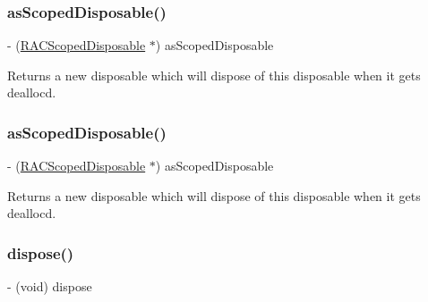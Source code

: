 \subsubsection{\texorpdfstring{as\+Scoped\+Disposable()}{asScopedDisposable()}\hspace{0.1cm}{\footnotesize\ttfamily [2/3]}}
{\footnotesize\ttfamily -\/ (\mbox{\hyperlink{interface_r_a_c_scoped_disposable}{R\+A\+C\+Scoped\+Disposable}} $\ast$) as\+Scoped\+Disposable \begin{DoxyParamCaption}{ }\end{DoxyParamCaption}}

Returns a new disposable which will dispose of this disposable when it gets dealloc\textquotesingle{}d. \mbox{\label{interface_r_a_c_disposable_a44a30ba7bac71901227b8a6eadaa23f5}} 
\subsubsection{\texorpdfstring{as\+Scoped\+Disposable()}{asScopedDisposable()}\hspace{0.1cm}{\footnotesize\ttfamily [3/3]}}
{\footnotesize\ttfamily -\/ (\mbox{\hyperlink{interface_r_a_c_scoped_disposable}{R\+A\+C\+Scoped\+Disposable}} $\ast$) as\+Scoped\+Disposable \begin{DoxyParamCaption}{ }\end{DoxyParamCaption}}

Returns a new disposable which will dispose of this disposable when it gets dealloc\textquotesingle{}d. \mbox{\label{interface_r_a_c_disposable_a3158dc03efcf49e7a5174acc6e3711d5}} 
\subsubsection{\texorpdfstring{dispose()}{dispose()}\hspace{0.1cm}{\footnotesize\ttfamily [1/3]}}
{\footnotesize\ttfamily -\/ (void) dispose \begin{DoxyParamCaption}{ }\end{DoxyParamCaption}}

